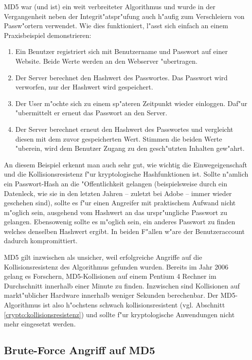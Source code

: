 \begin{refsection}
MD5 war (und ist) ein weit verbreiteter Algorithmus und wurde in der
Vergangenheit neben der Integrit"atspr"ufung auch h"aufig zum Verschleiern von
Passw"ortern verwendet.  Wie dies funktioniert, l"asst sich einfach an einem
Praxisbeispiel demonstrieren:

\begin{enumerate}
		\item Ein Benutzer registriert sich mit Benutzername und Passwort auf einer
			Website. Beide Werte werden an den Webserver "ubertragen.
		\item Der Server berechnet den Hashwert des Passwortes. Das Passwort wird
			verworfen, nur der Hashwert wird gespeichert.
		\item Der User m"ochte sich zu einem sp"ateren Zeitpunkt wieder einloggen.
			Daf"ur "ubermittelt er erneut das Passwort an den Server.
		\item Der Server berechnet erneut den Hashwert des Passwortes und
			vergleicht diesen mit dem zuvor gespeicherten Wert. Stimmen die beiden
			Werte "uberein, wird dem Benutzer Zugang zu den gesch"utzten Inhalten
			gew"ahrt.
\end{enumerate}

An diesem Beispiel erkennt man auch sehr gut, wie wichtig die Einwegeigenschaft
und die Kollisionsresistenz f"ur kryptologische Hashfunktionen ist. Sollte
n"amlich ein Passwort-Hash an die "Offentlichkeit gelangen (beispielsweise durch
ein Datenleck, wie sie in den letzten Jahren -- zuletzt bei Adobe -- immer
wieder geschehen sind), sollte es f"ur einen Angreifer mit praktischem Aufwand
nicht m"oglich sein, ausgehend vom Hashwert an das urspr"ungliche Passwort zu
gelangen. Ebensowenig sollte es m"oglich sein, ein anderes Passwort zu finden
welches denselben Hashwert ergibt. In beiden F"allen w"are der Benutzeraccount
dadurch kompromittiert.

MD5 gilt inzwischen als unsicher, weil erfolgreiche Angriffe auf die
Kollisionsresistenz des Algorithmus gefunden wurden. Bereits im Jahr 2006 gelang
es Forschern, MD5-Kollisionen auf einem Pentium 4 Rechner im Durchschnitt
innerhalb einer Minute zu finden\cite{crypto:stevens2006fast}. Inzwischen sind
Kollisionen auf markt"ublicher Hardware innerhalb weniger Sekunden berechenbar.
Der MD5-Algorithmus ist also h"ochstens schwach kollisionsresistent (vgl.
Abschnitt \ref{crypto:kollisionsresistenz}) und sollte f"ur kryptologische
Anwendungen nicht mehr eingesetzt werden.

\subsection{Brute-Force Angriff auf MD5}


\end{refsection}
